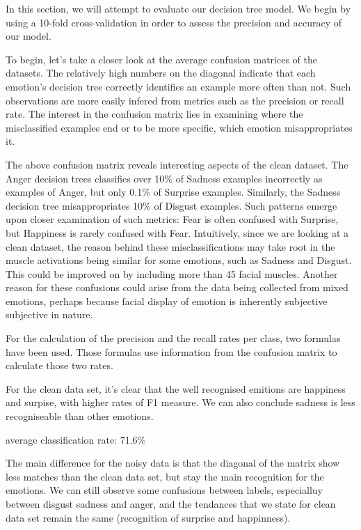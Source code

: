 In this section, we will attempt to evaluate our decision tree model. We begin by using a 10-fold cross-validation
in order to assess the precision and accuracy of our model. 

To begin, let's take a closer look at the average confusion matrices of the datasets.
The relatively high numbers on the diagonal indicate that each emotion's decision tree correctly
identifies an example more often than not. Such observations are more easily infered from metrics such as the precision or recall rate.
The interest in the confusion matrix lies in examining where the misclassified examples end or to be more specific,
which emotion misappropriates it. 



The above confusion matrix reveals interesting aspects of the clean dataset.
The Anger decision trees classifies over 10\% of Sadness examples incorrectly as examples of Anger, but only 0.1\% of Surprise examples.
Similarly, the Sadness decision tree misappropriates 10\% of Disgust examples.
Such patterns emerge upon closer examination of such metrics: Fear is often confused with Surprise, but Happiness is rarely confused with Fear.
Intuitively, since we are looking at a clean dataset,
the reason behind these misclassifications may take root in the muscle activations being similar for some emotions, such as Sadness and Disgust.
This could be improved on by including  more than 45 facial muscles.
Another reason for these confusions could arise from the data being collected from mixed emotions, perhaps because facial display
of emotion is inherently subjective subjective in nature.



For the calculation of the precision and the recall rates per class, two formulas have been used.
Those formulas use information from the confusion matrix to calculate those two rates.

For the clean data set, it's clear that the well recognised emitions are happiness and surpise, with higher rates of F1 measure. 
We can also conclude sadness is less recogniseable than other emotions.


average classification rate:
71.6\%
 


The main difference for the noisy data is that the diagonal of the matrix show less matches than the clean data set, but stay the main recognition for the emotions.
We can still observe some confusions between labels, especialluy between disgust sadness and anger, and the tendances that we state for clean data set remain the same (recognition of surprise and happinness).



